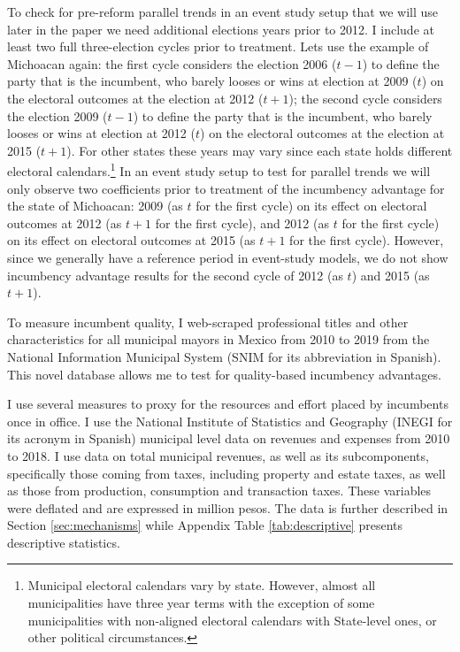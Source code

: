 \documentclass[12pt]{amsart}
\numberwithin{equation}{section}
\theoremstyle{definition}
\theoremstyle{definition}
\theoremstyle{definition}
\begin{document}
To check for pre-reform parallel trends in an event study setup that we will use later in the paper we need additional elections years prior to 2012. I include at least two full three-election cycles prior to treatment. Lets use the example of Michoacan again: the first cycle considers the election 2006 ($t-1$) to define the party that is the incumbent, who barely looses or wins at election at 2009 ($t$) on the electoral outcomes at the election at 2012 ($t+1$); the second cycle considers the election 2009 ($t-1$) to define the party that is the incumbent, who barely looses or wins at election at 2012 ($t$) on the electoral outcomes at the election at 2015 ($t+1$). For other states these years may vary since each state holds different electoral calendars.\footnote{Municipal electoral calendars vary by state. However, almost all municipalities have three year terms with the exception of some municipalities with non-aligned electoral calendars with State-level ones, or other political circumstances.} In an event study setup to test for parallel trends we will only observe two coefficients prior to treatment of the incumbency advantage for the state of Michoacan: 2009 (as $t$ for the first cycle) on its effect on electoral outcomes at 2012 (as $t+1$ for the first cycle), and 2012 (as $t$ for the first cycle) on its effect on electoral outcomes at 2015 (as $t+1$ for the first cycle). However, since we generally have a reference period in event-study models, we do not show incumbency advantage results for the second cycle of 2012 (as $t$) and 2015 (as $t+1$).  

To measure incumbent quality, I web-scraped professional titles and other characteristics for all municipal mayors in Mexico from 2010 to 2019 from the National Information Municipal System (SNIM for its abbreviation in Spanish). This novel database allows me to test for quality-based incumbency advantages.

I use several measures to proxy for the resources and effort placed by incumbents once in office. I use the National Institute of Statistics and Geography (INEGI for its acronym in Spanish) municipal level data on revenues and expenses from 2010 to 2018. I use data on total municipal revenues, as well as its subcomponents, specifically those coming from taxes, including property and estate taxes, as well as those from production, consumption and transaction taxes. These variables were deflated and are expressed in million pesos. The data is further described in Section \ref{sec:mechanisms} while Appendix Table \ref{tab:descriptive} presents descriptive statistics.
\end{document}
